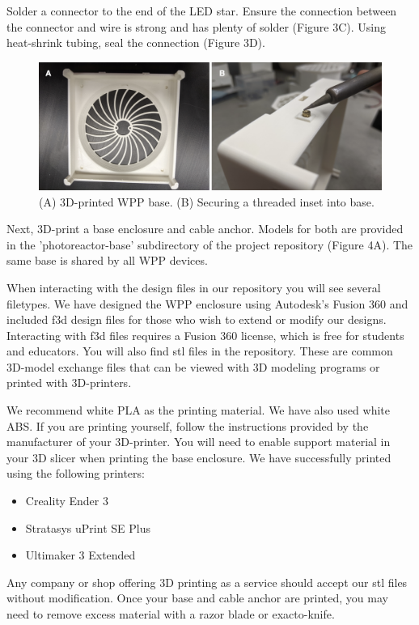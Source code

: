 \documentclass[11pt]{article}
\begin{document}
Solder a connector to the end of the LED star.
Ensure the connection between the connector and wire is strong and has plenty of solder (Figure 3C).
Using heat-shrink tubing, seal the connection (Figure 3D).

\begin{figure}[H]
	\includegraphics[width=\textwidth]{"./fig4.png"}
	\caption{(A) 3D-printed WPP base. (B) Securing a threaded inset into base.}
\end{figure}

Next, 3D-print a base enclosure and cable anchor.
Models for both are provided in the 'photoreactor-base' subdirectory of the project repository (Figure 4A).
The same base is shared by all WPP devices.

When interacting with the design files in our repository you will see several filetypes.
We have designed the WPP enclosure using Autodesk's Fusion 360 and included f3d design files for those who wish to extend or modify our designs.
Interacting with f3d files requires a Fusion 360 license, which is free for students and educators.
You will also find stl files in the repository.
These are common 3D-model exchange files that can be viewed with 3D modeling programs or printed with 3D-printers.

We recommend white PLA as the printing material. We have also used white ABS.
If you are printing yourself, follow the instructions provided by the manufacturer of your 3D-printer.
You will need to enable support material in your 3D slicer when printing the base enclosure.
We have successfully printed using the following printers:

\begin{itemize}
	\item Creality Ender 3
	\item Stratasys uPrint SE Plus
	\item Ultimaker 3 Extended
\end{itemize}

Any company or shop offering 3D printing as a service should accept our stl files without modification.
Once your base and cable anchor are printed, you may need to remove excess material with a razor blade or exacto-knife.
\end{document}
